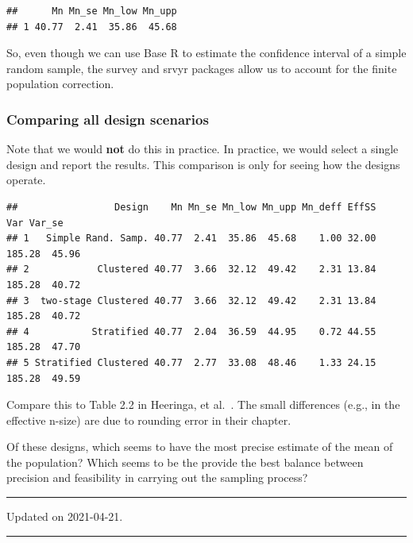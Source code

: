 \documentclass[
]{article}
\begin{document}
\begin{verbatim}
##      Mn Mn_se Mn_low Mn_upp
## 1 40.77  2.41  35.86  45.68
\end{verbatim}

So, even though we can use Base R to estimate the confidence interval of a simple random sample, the survey and srvyr packages allow us to account for the finite population correction.

\hypertarget{comparing-all-design-scenarios}{%
\subsubsection{Comparing all design scenarios}\label{comparing-all-design-scenarios}}

Note that we would \textbf{not} do this in practice. In practice, we would select a single design and report the results. This comparison is only for seeing how the designs operate.

\begin{verbatim}
##                 Design    Mn Mn_se Mn_low Mn_upp Mn_deff EffSS    Var Var_se
## 1   Simple Rand. Samp. 40.77  2.41  35.86  45.68    1.00 32.00 185.28  45.96
## 2            Clustered 40.77  3.66  32.12  49.42    2.31 13.84 185.28  40.72
## 3  two-stage Clustered 40.77  3.66  32.12  49.42    2.31 13.84 185.28  40.72
## 4           Stratified 40.77  2.04  36.59  44.95    0.72 44.55 185.28  47.70
## 5 Stratified Clustered 40.77  2.77  33.08  48.46    1.33 24.15 185.28  49.59
\end{verbatim}

Compare this to Table 2.2 in Heeringa, et al.~\citeyearpar{heeringa_applied_2010}. The small differences (e.g., in the effective n-size) are due to rounding error in their chapter.

Of these designs, which seems to have the most precise estimate of the mean of the population? Which seems to be the provide the best balance between precision and feasibility in carrying out the sampling process?

\begin{center}\rule{0.5\linewidth}{0.5pt}\end{center}

Updated on 2021-04-21.

\begin{center}\rule{0.5\linewidth}{0.5pt}\end{center}

  
\end{document}
